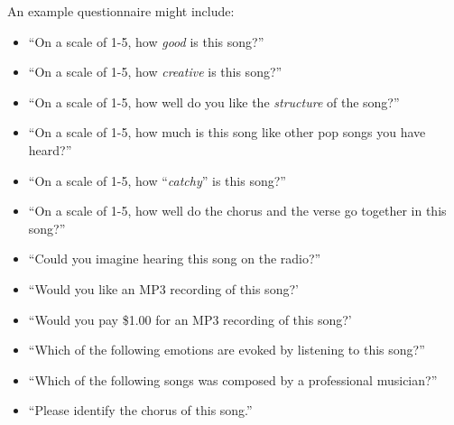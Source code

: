\documentclass[11pt,phd]{byuprop}
\begin{document}
An example questionnaire might include: 
\begin{itemize}
\item{``On a scale of 1-5, how \emph{good} is this song?''}
\item{``On a scale of 1-5, how \emph{creative} is this song?''}
\item{``On a scale of 1-5, how well do you like the \emph{structure} of the song?''}
\item{``On a scale of 1-5, how much is this song like other pop songs you have heard?''}
\item{``On a scale of 1-5, how ``\emph{catchy}'' is this song?''}
\item{``On a scale of 1-5, how well do the chorus and the verse go together in this song?''}
\item{``Could you imagine hearing this song on the radio?''}
\item{``Would you like an MP3 recording of this song?'}
\item{``Would you pay \$1.00 for an MP3 recording of this song?'}
\item{``Which of the following emotions are evoked by listening to this song?''}
\item{``Which of the following songs was composed by a professional musician?''}
\item{``Please identify the chorus of this song.''}
\end{itemize}

\end{document}
